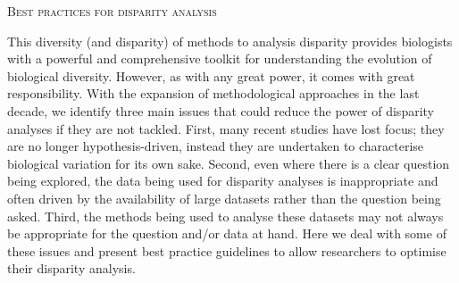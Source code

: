 \documentclass[12pt,letterpaper]{article}
\renewcommand{\section}[1]{%
\bigskip
\begin{center}
\begin{Large}
\normalfont\scshape #1
\medskip
\end{Large}
\end{center}}
\renewcommand{\subsection}[1]{%
\bigskip
\begin{center}
\begin{large}
\normalfont\itshape #1
\end{large}
\end{center}}
\begin{document}


\section{Best practices for disparity analysis}

This diversity (and disparity) of methods to analysis disparity provides biologists with a powerful and comprehensive toolkit for understanding the evolution of biological diversity.
However, as with any great power, it comes with great responsibility. 
With the expansion of methodological approaches in the last decade, we identify three main issues that could reduce the power of disparity analyses if they are not tackled.
First, many recent studies have lost focus; they are no longer hypothesis-driven, instead they are undertaken to characterise biological variation for its own sake.
Second, even where there is a clear question being explored, the data being used for disparity analyses is inappropriate and often driven by the availability of large datasets rather than the question being asked.
Third, the methods being used to analyse these datasets may not always be appropriate for the question and/or data at hand.
Here we deal with some of these issues and present best practice guidelines to allow researchers to optimise their disparity analysis.
\end{document}
